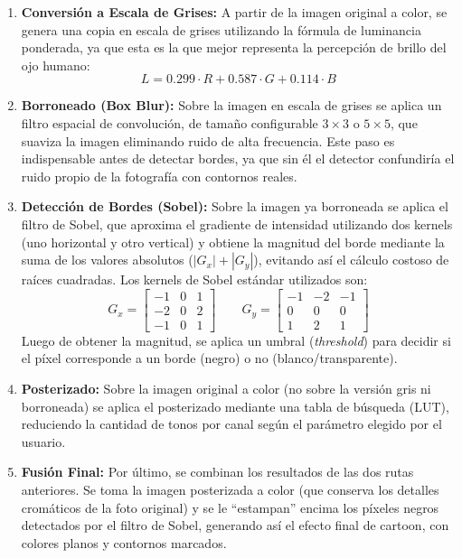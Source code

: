 \begin{enumerate}
    \item \textbf{Conversión a Escala de Grises:} A partir de la imagen original a color, se genera una copia en escala de grises utilizando la fórmula de luminancia ponderada, ya que esta es la que mejor representa la percepción de brillo del ojo humano:
    \begin{equation}
    \label{eq:luminancia}
    L = 0.299 \cdot R + 0.587 \cdot G + 0.114 \cdot B
    \end{equation}
    
    \item \textbf{Borroneado (Box Blur):} Sobre la imagen en escala de grises se aplica un filtro espacial de convolución, de tamaño configurable $3 \times 3$ o $5 \times 5$, que suaviza la imagen eliminando ruido de alta frecuencia. Este paso es indispensable antes de detectar bordes, ya que sin él el detector confundiría el ruido propio de la fotografía con contornos reales.
    
    \item \textbf{Detección de Bordes (Sobel):} Sobre la imagen ya borroneada se aplica el filtro de Sobel, que aproxima el gradiente de intensidad utilizando dos kernels (uno horizontal y otro vertical) y obtiene la magnitud del borde mediante la suma de los valores absolutos ($|G_x| + |G_y|$), evitando así el cálculo costoso de raíces cuadradas. Los kernels de Sobel estándar utilizados son:
    \begin{equation}
    \label{eq:sobel_gx}
    G_x = \begin{bmatrix} -1 & 0 & 1 \\ -2 & 0 & 2 \\ -1 & 0 & 1 \end{bmatrix}
    \qquad
    G_y = \begin{bmatrix} -1 & -2 & -1 \\ 0 & 0 & 0 \\ 1 & 2 & 1 \end{bmatrix}
    \end{equation}
    Luego de obtener la magnitud, se aplica un umbral (\textit{threshold}) para decidir si el píxel corresponde a un borde (negro) o no (blanco/transparente).
    
    \item \textbf{Posterizado:} Sobre la imagen original a color (no sobre la versión gris ni borroneada) se aplica el posterizado mediante una tabla de búsqueda (LUT), reduciendo la cantidad de tonos por canal según el parámetro elegido por el usuario.
    
    \item \textbf{Fusión Final:} Por último, se combinan los resultados de las dos rutas anteriores. Se toma la imagen posterizada a color (que conserva los detalles cromáticos de la foto original) y se le ``estampan'' encima los píxeles negros detectados por el filtro de Sobel, generando así el efecto final de cartoon, con colores planos y contornos marcados.
\end{enumerate}

